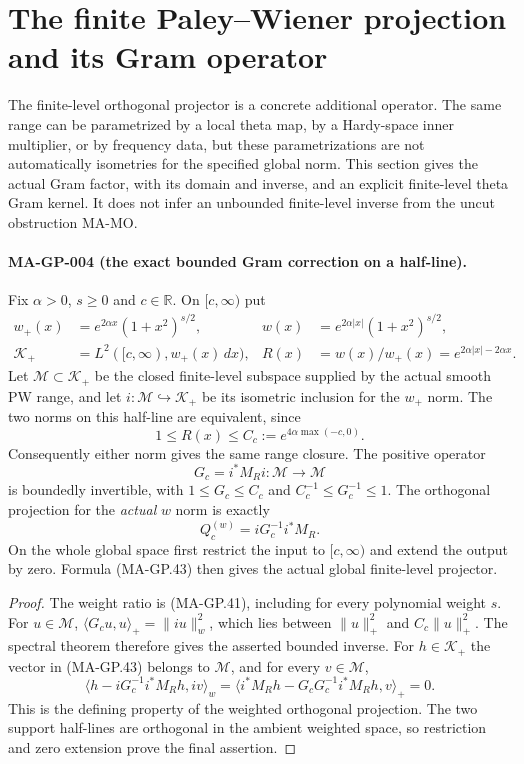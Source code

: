 \section{The finite Paley--Wiener projection and its Gram operator}
\label{sec:global-gram}

The finite-level orthogonal projector is a concrete additional
operator.  The same range can be parametrized by a local theta
map, by a Hardy-space inner multiplier, or by frequency data,
but these parametrizations are not automatically isometries for
the specified global norm.  This section gives the actual Gram
factor, with its domain and inverse, and an explicit finite-level
theta Gram kernel.  It does not infer an unbounded finite-level
inverse from the uncut obstruction MA-MO.

\paragraph{MA-GP-004 (the exact bounded Gram correction on a half-line).}
Fix $\alpha>0$, $s\ge0$ and $c\in\mathbb R$.  On $[c,\infty)$
put
\[
 \begin{aligned}
 w_+(x)&=e^{2\alpha x}(1+x^2)^{s/2},&
 w(x)&=e^{2\alpha|x|}(1+x^2)^{s/2},\\
 \mathcal K_+&=L^2([c,\infty),w_+(x)\,dx),&
 R(x)&=w(x)/w_+(x)=e^{2\alpha|x|-2\alpha x}.
 \end{aligned}
 \tag{MA-GP.40}
\]
Let $\mathcal M\subset\mathcal K_+$ be the closed finite-level
subspace supplied by the actual smooth PW range, and let
$i:\mathcal M\hookrightarrow\mathcal K_+$ be its isometric
inclusion for the $w_+$ norm.  The two norms on this half-line
are equivalent, since
\[
            1\le R(x)\le C_c:=e^{4\alpha\max(-c,0)}.
 \tag{MA-GP.41}
\]
Consequently either norm gives the same range closure.  The
positive operator
\[
              G_c=i^*M_Ri:\mathcal M\to\mathcal M
 \tag{MA-GP.42}
\]
is boundedly invertible, with $1\le G_c\le C_c$ and
$C_c^{-1}\le G_c^{-1}\le1$.  The orthogonal projection for
the \emph{actual} $w$ norm is exactly
\[
                  Q_c^{(w)}=iG_c^{-1}i^*M_R.
 \tag{MA-GP.43}
\]
On the whole global space first restrict the input to
$[c,\infty)$ and extend the output by zero.  Formula
(MA-GP.43) then gives the actual global finite-level projector.

\begin{proof}
The weight ratio is (MA-GP.41), including for every polynomial
weight $s$.  For $u\in\mathcal M$,
$\langle G_cu,u\rangle_+=\|iu\|_w^2$, which lies between
$\|u\|_+^2$ and $C_c\|u\|_+^2$.  The spectral theorem
therefore gives the asserted bounded inverse.
For $h\in\mathcal K_+$ the vector in (MA-GP.43) belongs
to $\mathcal M$, and for every $v\in\mathcal M$,
\[
 \langle h-iG_c^{-1}i^*M_Rh,iv\rangle_w
   =\langle i^*M_Rh-G_cG_c^{-1}i^*M_Rh,v\rangle_+=0.
 \tag{MA-GP.44}
\]
This is the defining property of the weighted orthogonal
projection.  The two support half-lines are orthogonal in
the ambient weighted space, so restriction and zero extension
prove the final assertion.
\end{proof}

